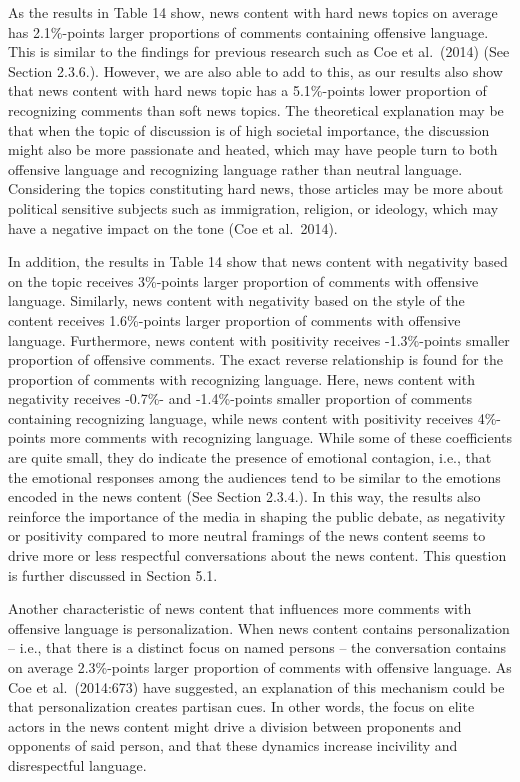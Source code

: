 \documentclass[
]{article}
\begin{document}
As the results in Table 14 show, news content with hard news topics on
average has 2.1\%-points larger proportions of comments containing
offensive language. This is similar to the findings for previous
research such as Coe et al.~(2014) (See Section 2.3.6.). However, we are
also able to add to this, as our results also show that news content
with hard news topic has a 5.1\%-points lower proportion of recognizing
comments than soft news topics. The theoretical explanation may be that
when the topic of discussion is of high societal importance, the
discussion might also be more passionate and heated, which may have
people turn to both offensive language and recognizing language rather
than neutral language. Considering the topics constituting hard news,
those articles may be more about political sensitive subjects such as
immigration, religion, or ideology, which may have a negative impact on
the tone (Coe et al.~2014).

In addition, the results in Table 14 show that news content with
negativity based on the topic receives 3\%-points larger proportion of
comments with offensive language. Similarly, news content with
negativity based on the style of the content receives 1.6\%-points
larger proportion of comments with offensive language. Furthermore, news
content with positivity receives -1.3\%-points smaller proportion of
offensive comments. The exact reverse relationship is found for the
proportion of comments with recognizing language. Here, news content
with negativity receives -0.7\%- and -1.4\%-points smaller proportion of
comments containing recognizing language, while news content with
positivity receives 4\%-points more comments with recognizing language.
While some of these coefficients are quite small, they do indicate the
presence of emotional contagion, i.e., that the emotional responses
among the audiences tend to be similar to the emotions encoded in the
news content (See Section 2.3.4.). In this way, the results also
reinforce the importance of the media in shaping the public debate, as
negativity or positivity compared to more neutral framings of the news
content seems to drive more or less respectful conversations about the
news content. This question is further discussed in Section 5.1.

Another characteristic of news content that influences more comments
with offensive language is personalization. When news content contains
personalization -- i.e., that there is a distinct focus on named persons
-- the conversation contains on average 2.3\%-points larger proportion
of comments with offensive language. As Coe et al.~(2014:673) have
suggested, an explanation of this mechanism could be that
personalization creates partisan cues. In other words, the focus on
elite actors in the news content might drive a division between
proponents and opponents of said person, and that these dynamics
increase incivility and disrespectful language.
\end{document}
